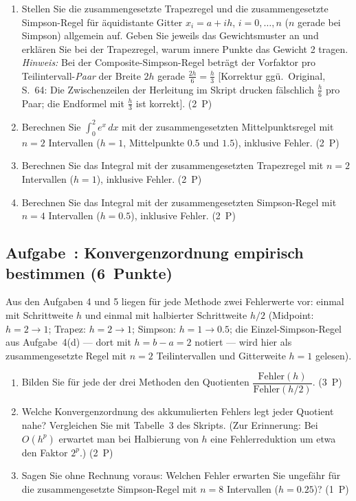 \documentclass[a4paper,11pt]{scrartcl}
\newcounter{aufgabe}
\newcommand{\Aufgabe}[2]{%
  \refstepcounter{aufgabe}%
  \subsection*{Aufgabe~\theaufgabe: #1 \hfill (#2~Punkte)}%
  \label{auf:\theaufgabe}}
\begin{document}
\begin{enumerate}[label=(\alph*)]
  \item Stellen Sie die zusammengesetzte Trapezregel und die zusammengesetzte Simpson-Regel für äquidistante Gitter $x_i = a + ih$, $i = 0, \ldots, n$ ($n$ gerade bei Simpson) allgemein auf. Geben Sie jeweils das Gewichtsmuster an und erklären Sie bei der Trapezregel, warum innere Punkte das Gewicht 2 tragen. \emph{Hinweis:} Bei der Composite-Simpson-Regel beträgt der Vorfaktor pro Teilintervall-\emph{Paar} der Breite $2h$ gerade $\frac{2h}{6} = \frac{h}{3}$ [Korrektur ggü.\ Original, S.~64: Die Zwischenzeilen der Herleitung im Skript drucken fälschlich $\frac{h}{6}$ pro Paar; die Endformel mit $\frac{h}{3}$ ist korrekt]. \hfill (2~P)
  \item Berechnen Sie $\int_0^2 e^x\,dx$ mit der zusammengesetzten Mittelpunktsregel mit $n = 2$ Intervallen ($h = 1$, Mittelpunkte $0.5$ und $1.5$), inklusive Fehler. \hfill (2~P)
  \item Berechnen Sie das Integral mit der zusammengesetzten Trapezregel mit $n = 2$ Intervallen ($h = 1$), inklusive Fehler. \hfill (2~P)
  \item Berechnen Sie das Integral mit der zusammengesetzten Simpson-Regel mit $n = 4$ Intervallen ($h = 0.5$), inklusive Fehler. \hfill (2~P)
\end{enumerate}

\schreibraum[11]
\Aufgabe{Konvergenzordnung empirisch bestimmen}{6}

Aus den Aufgaben 4 und 5 liegen für jede Methode zwei Fehlerwerte vor: einmal mit Schrittweite $h$ und einmal mit halbierter Schrittweite $h/2$ (Midpoint: $h = 2 \to 1$; Trapez: $h = 2 \to 1$; Simpson: $h = 1 \to 0.5$; die Einzel-Simpson-Regel aus Aufgabe~4(d) --- dort mit $h = b - a = 2$ notiert --- wird hier als zusammengesetzte Regel mit $n = 2$ Teilintervallen und Gitterweite $h = 1$ gelesen).

\begin{enumerate}[label=(\alph*)]
  \item Bilden Sie für jede der drei Methoden den Quotienten $\dfrac{\text{Fehler}(h)}{\text{Fehler}(h/2)}$. \hfill (3~P)
  \item Welche Konvergenzordnung des akkumulierten Fehlers legt jeder Quotient nahe? Vergleichen Sie mit Tabelle~3 des Skripts. (Zur Erinnerung: Bei $O(h^p)$ erwartet man bei Halbierung von $h$ eine Fehlerreduktion um etwa den Faktor $2^p$.) \hfill (2~P)
  \item Sagen Sie ohne Rechnung voraus: Welchen Fehler erwarten Sie ungefähr für die zusammengesetzte Simpson-Regel mit $n = 8$ Intervallen ($h = 0.25$)? \hfill (1~P)
\end{enumerate}
\end{document}
